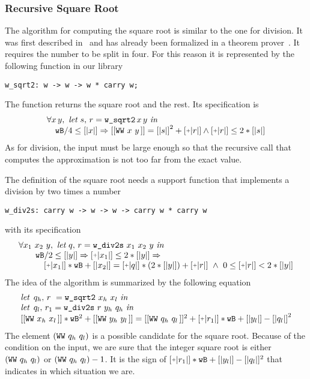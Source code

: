 \subsubsection{Recursive Square Root}

The algorithm for computing the square root is similar to the one for division.
It was first described in~\cite{RecSqrt} and has already been formalized in a 
theorem prover~\cite{BerMagZim02}. It requires the number to be split
in four. For this reason it is represented by the following function in our
library
\begin{verbatim}
w_sqrt2: w -> w -> w * carry w;
\end{verbatim}
The function returns the square root and the rest.
Its specification is
$$\begin{array}{l}
\forall x\, y,\,\, \textit{let}\,\, s,\, r = \texttt{w\_sqrt2}\, x\, y\,\, \textit{in}\\
\hskip10pt \wB / 4 \le [|x|] \Rightarrow [[\WW x y]] = {[|s|]} ^ 2 + \ICP{r} \land \ICP{r} \le 2 * [|s|]
\end{array}
$$
As for division, the input must be large enough so that the recursive call
that computes the approximation is not too far from the exact value. 

The definition of the square root needs a support function that implements a division
by two times a number
\begin{verbatim}
w_div2s: carry w -> w -> w -> carry w * carry w
\end{verbatim}
with its specification
$$\begin{array}{l}
\forall x_1\,\, x_2\,\, y, \,\, \textit{let}\,\, q,\, r = \texttt{w\_div2s}\,\, x_1\,\, x_2\,\, y\,\, \textit{in}\\
\hskip20pt \wB / 2 \le [|y|] \Rightarrow \ICP{x_1} \le 2 * [|y|] \Rightarrow\\
\hskip30pt \ICP{x_1} * \wB + [|x_2|] = \ICP{q} *  (2 * [|y|]) + \ICP{r} \,\, \land\,\, 0 \le \ICP{r} < 2 * [|y|]
\end{array}
$$
The idea of the algorithm is summarized by the following equation
$$\begin{array}{l}
\textit{let}\,\,\, {q_h} ,\, r\,\, = \texttt{w\_sqrt2}\,\, {x_h}\,\, {x_l}\,\, \textit{in}\\
\textit{let}\,\,\, {q_l} ,\, r_1 = \texttt{w\_div2s}\,\, r\,\, {y_h}\,\, {q_h}\,\, \textit{in}\\
{[[\WW {x_h} {x_l}]]} * \wB ^ 2 + [[\WW {y_h} {y_l}]] =
    [[\WW {q_h} {q_l}]] ^ 2 + \ICP{r_1} * \wB + [|{y_l}|] - {[|q_l|]} ^ 2 \\
\end{array}
$$
The element $(\texttt{WW}\,\,q_h\,\,q_l\,\!)$ is a possible candidate
for the square root. Because of the condition on
the input, we are sure that the integer square root is either 
$(\texttt{WW}\,\,q_h\,\,q_l\,\!)$ or
$(\texttt{WW}\,\,q_h\,\,q_l\,\!) - 1$. It is the sign of $\ICP{r_1} * \wB + 
[|{y_l}|] - [|q_l|] ^ 2$ that indicates in which situation we are. 
